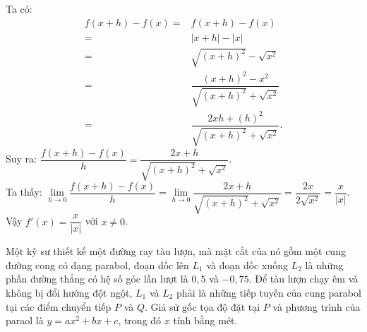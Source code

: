 \begin{bt}
\begin{bt}
{\begin{itemize}
	Ta có: 
	\begin{eqnarray*}
		f(x+h)-f(x)=&f(x+h)-f(x)\\
	=&|x+h|-|x|\\
	=&\sqrt{\left(x+h\right)^2}-\sqrt{x^2}\\
	=&\dfrac{\left(x+h\right)^2-x^2}{\sqrt{\left(x+h\right)^2}+\sqrt{x^2}}\\
	=&\dfrac{2xh+(h)^2}{\sqrt{\left(x+h\right)^2}+\sqrt{x^2}}.
	\end{eqnarray*}
	Suy ra: $\dfrac{f(x+h)-f(x)}{h}=\dfrac{2x+h}{\sqrt{\left(x+h\right)^2}+\sqrt{x^2}}$.\\
	Ta thấy: $\lim\limits_{h\to 0}\dfrac{f(x+h)-f(x)}{h}=\lim\limits_{h\to 0}\dfrac{2x+h}{\sqrt{\left(x+h\right)^2}+\sqrt{x^2}}=\dfrac{2x}{2\sqrt{x^2}}=\dfrac{x}{|x|}$.\\
	Vậy $f'(x)=\dfrac{x}{|x|}$ với $x\neq0$.
	\end{itemize}
	}
\end{bt}
\begin{bt}%
	Một kỹ sư thiết kế một đường ray tàu lượn, mà mặt cắt của nó gồm một cung đường cong có dạng parabol, đoạn dốc lên $L_1$ và đoạn dốc xuống $L_2$ là những phần đường thẳng có hệ số góc lần lượt là $0{,}5$ và $-0{,}75$. Để tàu lượn chạy êm và không bị đổi hướng đột ngột, $L_1$ và $L_2$ phải là những tiếp tuyến của cung parabol tại các điểm chuyển tiếp $P$ và $Q$. Giả sử gốc tọa độ đặt tại $P$ và phương trình của paraol là $y=ax^2+bx+c$, trong đó $x$ tính bằng mét.
\end{bt}
\end{bt}
